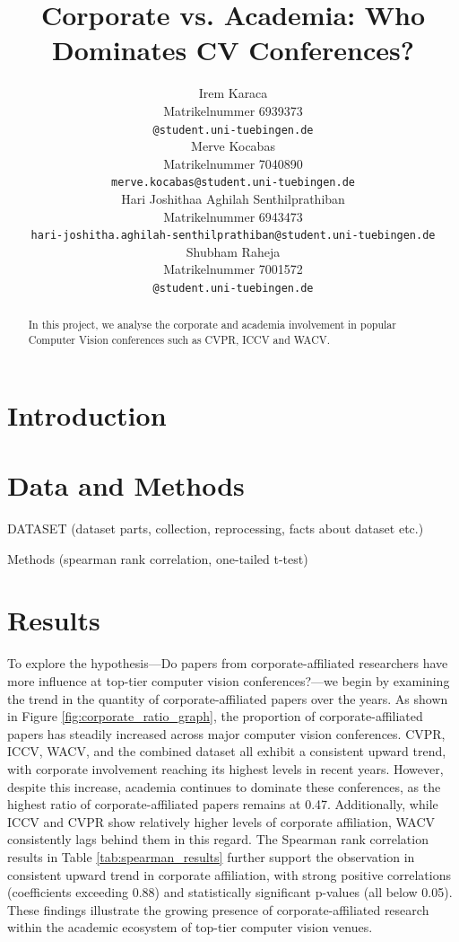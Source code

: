\documentclass{article}
\title{Corporate vs. Academia: Who Dominates CV Conferences?}
\author{%
  Irem Karaca\\
  Matrikelnummer 6939373\\
  \texttt{@student.uni-tuebingen.de} \\
  \And
  Merve Kocabas\\
  Matrikelnummer 7040890\\
  \texttt{merve.kocabas@student.uni-tuebingen.de} \\
  \And
  Hari Joshithaa Aghilah Senthilprathiban\\
  Matrikelnummer 6943473\\
  \texttt{hari-joshitha.aghilah-senthilprathiban@student.uni-tuebingen.de} \\
  \And
  Shubham Raheja\\
  Matrikelnummer 7001572\\
  \texttt{@student.uni-tuebingen.de} \\
}
\begin{document}
\maketitle

\begin{abstract}

  In this project, we analyse the corporate and academia involvement in popular Computer Vision conferences such as CVPR, ICCV and WACV. 
\end{abstract}


\section{Introduction}


\section{Data and Methods}
DATASET (dataset parts, collection, reprocessing, facts about dataset etc.)

Methods (spearman rank correlation, one-tailed t-test)


\section{Results}
To explore the hypothesis—Do papers from corporate-affiliated researchers have more influence at top-tier computer vision conferences?—we begin by examining the trend in the quantity of corporate-affiliated papers over the years. As shown in Figure \ref{fig:corporate_ratio_graph}, the proportion of corporate-affiliated papers has steadily increased across major computer vision conferences. CVPR, ICCV, WACV, and the combined dataset all exhibit a consistent upward trend, with corporate involvement reaching its highest levels in recent years. However, despite this increase, academia continues to dominate these conferences, as the highest ratio of corporate-affiliated papers remains at 0.47. Additionally, while ICCV and CVPR show relatively higher levels of corporate affiliation, WACV consistently lags behind them in this regard. The Spearman rank correlation results in Table \ref{tab:spearman_results} further support the observation in consistent upward trend in corporate affiliation, with strong positive correlations (coefficients exceeding 0.88) and statistically significant p-values (all below 0.05). These findings illustrate the growing presence of corporate-affiliated research within the academic ecosystem of top-tier computer vision venues.
\end{document}
